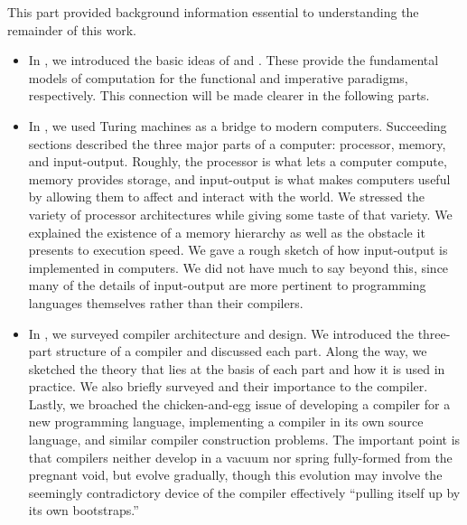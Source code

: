 \label{background:conclusion}
This part provided background information essential to understanding the remainder of this work.
\begin{itemize}
\item In , we introduced the basic ideas of \lambdacalc and \TMs. These provide the fundamental models of computation for the functional and imperative paradigms, respectively. This connection will be made clearer in the following parts.

\item In , we used Turing machines as a bridge to modern computers. Succeeding sections described the three major parts of a computer: processor, memory, and input-output. Roughly, the processor is what lets a computer compute, memory provides storage, and input-output is what makes computers useful by allowing them to affect and interact with the world. We stressed the variety of processor architectures while giving some taste of that variety. We explained the existence of a memory hierarchy as well as the obstacle it presents to execution speed. We gave a rough sketch of how input-output is implemented in computers. We did not have much to say beyond this, since many of the details of input-output are more pertinent to programming languages themselves rather than their compilers.

\item In , we surveyed compiler architecture and design. We introduced the three-part structure of a compiler and discussed each part. Along the way, we sketched the theory that lies at the basis of each part and how it is used in practice. We also briefly surveyed \IRs and their importance to the compiler. Lastly, we broached the chicken-and-egg issue of developing a compiler for a new programming language, implementing a compiler in its own source language, and similar compiler construction problems. The important point is that compilers neither develop in a vacuum nor spring fully-formed from the pregnant void, but evolve gradually, though this evolution may involve the seemingly contradictory device of the compiler effectively ``pulling itself up by its own bootstraps.''
\end{itemize}

